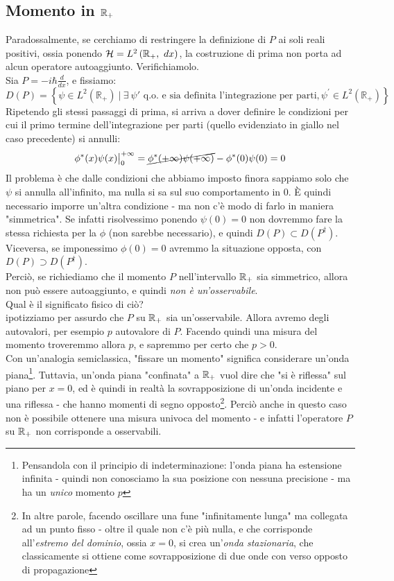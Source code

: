 \documentclass[../../FisicaTeorica.tex]{subfiles}
\begin{document}
\subsection{Momento in $\mathbb{R}_+$}
Paradossalmente, se cerchiamo di restringere la definizione di $P$ ai soli reali positivi, ossia ponendo $\mathcal{H}=L^2\left(\mathbb{R}_+,\ dx\right)$, la costruzione di prima non porta ad alcun operatore autoaggiunto. Verifichiamolo.\\
Sia $P= -i\hbar \frac{d}{dx}$, e fissiamo:
\[
D\left(P\right)= \left\{\psi\in L^2\left(\mathbb{R}_+\right)\ |\ \exists\> \psi'
\text{ q.o. e sia definita l'integrazione per parti}, \psi^\prime\in L^2(\mathbb{R}_+)\right\}
\]
Ripetendo gli stessi passaggi di prima, si arriva a dover definire le condizioni per cui il primo termine dell'integrazione per parti (quello evidenziato in giallo nel caso precedente) si annulli:
\[
\phi^*(x)\psi(x)\big|_{0}^{+\infty} = \cancel{\phi^*(+\infty)\psi(+\infty)} - \phi^*(0)\psi(0) = 0
\]
Il problema è che dalle condizioni che abbiamo imposto finora sappiamo solo che $\psi$ si annulla all'infinito, ma nulla si sa sul suo comportamento in $0$. È quindi necessario imporre un'altra condizione - ma non c'è modo di farlo in maniera "simmetrica". Se infatti risolvessimo ponendo $\psi(0) = 0$ non dovremmo fare la stessa richiesta per la $\phi$ (non sarebbe necessario), e quindi $D(P) \subset D(P^\dag)$. Viceversa, se imponessimo $\phi(0) = 0$ avremmo la situazione opposta, con $D(P) \supset D(P^\dag)$.\\
Perciò, se richiediamo che il momento $P$ nell'intervallo $\mathbb{R}_+$ sia simmetrico, allora non può essere autoaggiunto, e quindi \textit{non è un'osservabile}.\\
Qual è il significato fisico di ciò?\\
ipotizziamo per assurdo che $P$ su $\mathbb{R}_+$ sia un'osservabile. Allora avremo degli autovalori, per esempio $p$ autovalore di $P$. Facendo quindi una misura del momento troveremmo allora $p$, e sapremmo per certo che $p>0$.\\
Con un'analogia semiclassica, "fissare un momento" significa considerare un'onda piana\footnote{Pensandola con il principio di indeterminazione: l'onda piana ha estensione infinita - quindi non conosciamo la sua posizione con nessuna precisione - ma ha un \textit{unico} momento $p$}. Tuttavia, un'onda piana "confinata" a $\mathbb{R}_+$ vuol dire che "si è riflessa" sul piano per $x=0$, ed è quindi in realtà la sovrapposizione di un'onda incidente e una riflessa - che hanno momenti di segno opposto\footnote{In altre parole, facendo oscillare una fune "infinitamente lunga" ma collegata ad un punto fisso - oltre il quale non c'è più nulla, e che corrisponde all'\textit{estremo del dominio}, ossia $x=0$, si crea un'\textit{onda stazionaria}, che classicamente si ottiene come sovrapposizione di due onde con verso opposto di propagazione}. Perciò anche in questo caso non è possibile ottenere una misura univoca del momento - e infatti l'operatore $P$ su $\mathbb{R}_+$ non corrisponde a osservabili.
\end{document}
